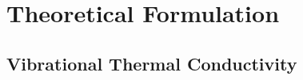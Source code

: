 \documentclass[aps,prb,twocolumn,superscriptaddress,footinbib,amsmath,amssymb,floatfix]{revtex4}
\begin{document}

\section{\label{S:Theory}Theoretical Formulation}

\subsection{\label{S:Theory:Thermal}Vibrational Thermal Conductivity}
\end{document}
